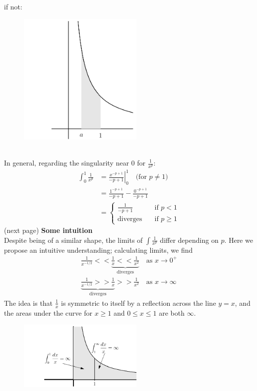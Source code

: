 \documentclass{report}
\begin{document}
if not:
\begin{figure}[h]
\includegraphics[width=6cm]{Capture55}\\
\centering
{} 
\end{figure}\\
In general, regarding the singularity near 0 for $\frac{1}{x^p}$:
\begin{align*}
\int_0^1\frac{1}{x^p}&=\left.\frac{x^{-p+1}}{-p+1}\right|_0^1\quad\text{(for $p\neq1$)}\\
&=\frac{1^{-p+1}}{-p+1}-\frac{0^{-p+1}}{-p+1}\\
&=
\begin{cases}
\frac{1}{-p+1}\quad&\text{if }p<1\\
\text{diverges}\quad&\text{if }p\geq1
\end{cases}
\end{align*}
(next page)
\newpage
\noindent\textbf{Some intuition}\\
Despite being of a similar shape, the limits of $\int\frac{1}{x^p}$ differ depending on $p$.
Here we propose an intuitive understanding; calculating limits, we find
\begin{align*}
\frac{1}{x^{-1/2}}<<\underbrace{\frac{1}{x}<<\frac{1}{x^2}}_{\text{diverges}}\quad\text{as }
x\to0^+\\
\underbrace{\frac{1}{x^{-1/2}}>>\frac{1}{x}}_{\text{diverges}}>>\frac{1}{x^2}\quad\text{as }
x\to\infty
\end{align*}
The idea is that $\frac{1}{x}$ is symmetric to itself by a reflection across the line $y=x$, 
and the areas under the curve for $x\geq1$ and $0\leq x\leq1$ are both $\infty$.
\begin{figure}[h]
\includegraphics[width=6cm]{Capture56}\\
\centering
{} 
\end{figure}\\
\end{document}
